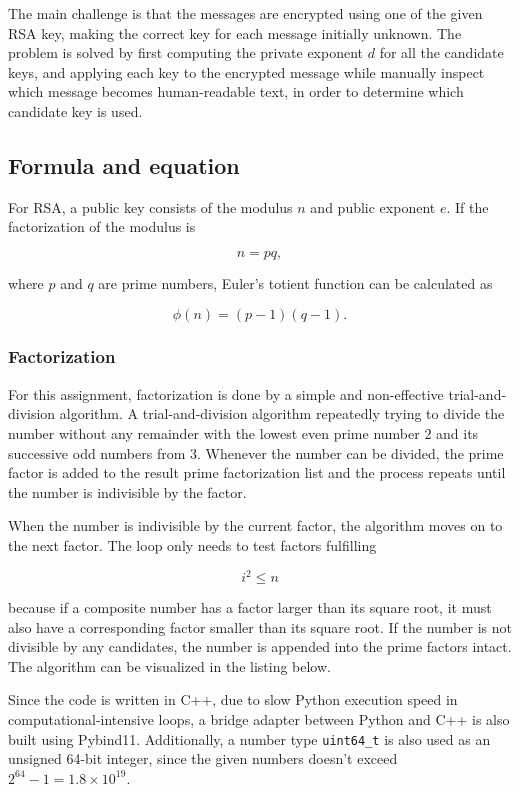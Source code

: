 \documentclass[11pt,a4paper]{article}
\begin{document}
The main challenge is that the messages are encrypted using one of the given RSA key, making the correct key for each message initially unknown. The problem is solved by first computing the private exponent $d$ for all the candidate keys, and applying each key to the encrypted message while manually inspect which message becomes human-readable text, in order to determine which candidate key is used.

\subsection*{Formula and equation}

For RSA, a public key consists of the modulus $n$ and public exponent $e$. If the factorization of the modulus is

\[
n = pq,
\]

where $p$ and $q$ are prime numbers, Euler's totient function can be calculated as

\[
\phi(n) = (p-1)(q-1).
\]

\subsubsection*{Factorization}

For this assignment, factorization is done by a simple and non-effective trial-and-division algorithm. A trial-and-division algorithm repeatedly trying to divide the number without any remainder with the lowest even prime number $2$ and its successive odd numbers from $3$. Whenever the number can be divided, the prime factor is added to the result prime factorization list and the process repeats until the number is indivisible by the factor.

When the number is indivisible by the current factor, the algorithm moves on to the next factor. The loop only needs to test factors fulfilling

$$ i^2 \leq n $$

because if a composite number has a factor larger than its square root, it must also have a corresponding factor smaller than its square root. If the number is not divisible by any candidates, the number is appended into the prime factors intact. The algorithm can be visualized in the listing below.

Since the code is written in C++, due to slow Python execution speed in computational-intensive loops, a bridge adapter between Python and C++ is also built using Pybind11. Additionally, a number type \texttt{uint64\_t} is also used as an unsigned 64-bit integer, since the given numbers doesn't exceed $2^{64}-1 = 1.8 \times 10^{19}$.
\end{document}
